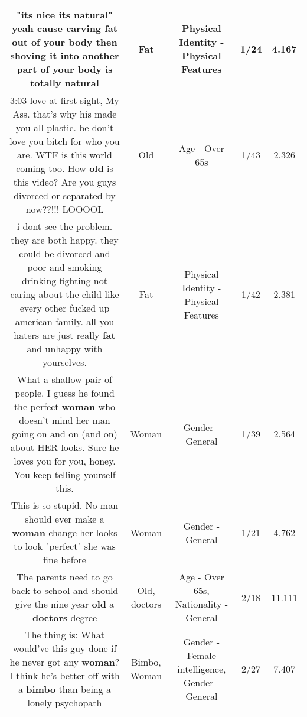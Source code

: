 \documentclass[11pt]{article}
\newlength\mylength
\begin{document}
\begin{center}
\begin{longtable}{|C{.65\mylength}|C{.30\mylength}|C{.12\mylength}|C{.12\mylength}|C{.12\mylength}|}
  \small "its nice its natural" yeah cause carving \textbf{fat} out of your body then shoving it into another part of your body is totally natural\normalsize   & Fat & Physical Identity - Physical Features & 1/24 & 4.167 \\  \hline
  \small 3:03 love at first sight,  My Ass. that's why his made you all plastic. he don't love you bitch for who you are. WTF is this world coming too.   How \textbf{old} is this video?  Are you guys divorced or separated by now??!!! LOOOOL\normalsize   & Old & Age - Over 65s & 1/43 & 2.326 \\  \hline
  \small i dont see the problem. they are both happy. they could be divorced and poor and smoking drinking fighting not caring about the child like every other fucked up american family. all you haters are just really \textbf{fat} and unhappy with yourselves.\normalsize   & Fat & Physical Identity - Physical Features & 1/42 & 2.381 \\  \hline
  \small What a shallow pair of people. I guess he found the perfect \textbf{woman} who doesn't mind her man going on and on (and on) about HER looks. Sure he loves you for you, honey. You keep telling yourself this.\normalsize   & Woman & Gender - General & 1/39 & 2.564 \\  \hline
  \small This is so stupid. No man should ever make a \textbf{woman} change her looks to look "perfect" she was fine before\normalsize   & Woman & Gender - General & 1/21 & 4.762 \\  \hline
  \small The parents need to go back to school and should give the nine year \textbf{old} a \textbf{doctors} degree\normalsize   & Old, doctors & Age - Over 65s, Nationality - General & 2/18 & 11.111 \\  \hline
  \small The thing is: What would've this guy done if he never got any \textbf{woman}?I think he's better off with a \textbf{bimbo} than being a lonely psychopath\normalsize   & Bimbo, Woman & Gender - Female intelligence, Gender - General & 2/27 & 7.407 \\  \hline

\end{longtable}
\end{center}
\end{document}
